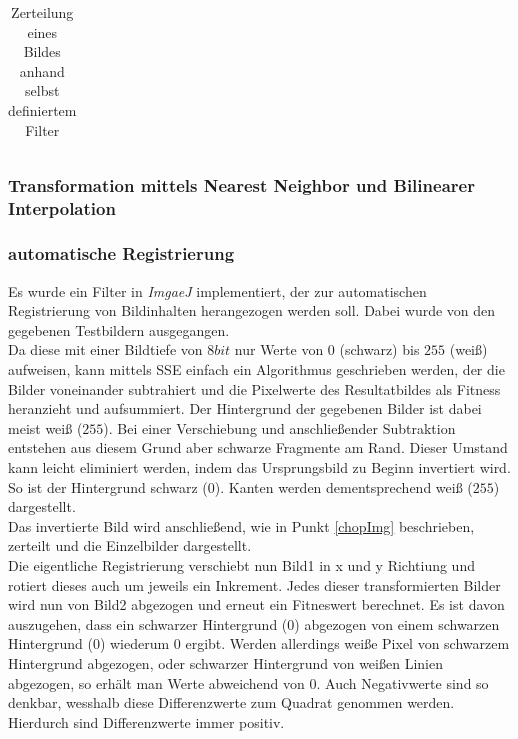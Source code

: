 \documentclass[12pt,german]{article}
\begin{document}
\begin{table}[H]
\begin{tabular}{| c | c | c |}
  \end{tabular}
  \caption{Zerteilung eines Bildes anhand selbst definiertem Filter}
  \label{tab:chopInHalfTest}
\end{table}



\subsubsection{Transformation mittels Nearest Neighbor und Bilinearer Interpolation}




\subsubsection{automatische Registrierung}
Es wurde ein Filter in \textit{ImgaeJ} implementiert, der zur automatischen Registrierung von Bildinhalten herangezogen werden soll. Dabei wurde von den gegebenen Testbildern ausgegangen. \\
Da diese mit einer Bildtiefe von $8 bit$ nur Werte von $0$ (schwarz) bis $255$ (weiß) aufweisen, kann mittels SSE einfach ein Algorithmus geschrieben werden, der die Bilder voneinander subtrahiert und die Pixelwerte des Resultatbildes als Fitness heranzieht und aufsummiert. Der Hintergrund der gegebenen Bilder ist dabei meist weiß ($255$). Bei einer Verschiebung und anschließender Subtraktion entstehen aus diesem Grund aber schwarze Fragmente am Rand. Dieser Umstand kann leicht eliminiert werden, indem das Ursprungsbild zu Beginn invertiert wird. So ist der Hintergrund schwarz ($0$). Kanten werden dementsprechend weiß ($255$) dargestellt. \\
Das invertierte Bild wird anschließend, wie in Punkt \ref{chopImg} beschrieben, zerteilt und die Einzelbilder dargestellt. \\
Die eigentliche Registrierung verschiebt nun Bild1 in x und y Richtiung und rotiert dieses auch um jeweils ein Inkrement. Jedes dieser transformierten Bilder wird nun von Bild2 abgezogen und erneut ein Fitneswert berechnet. Es ist davon auszugehen, dass ein schwarzer Hintergrund ($0$) abgezogen von einem schwarzen Hintergrund ($0$) wiederum $0$ ergibt. Werden allerdings weiße Pixel von schwarzem Hintergrund abgezogen, oder schwarzer Hintergrund von weißen Linien abgezogen, so erhält man Werte abweichend von $0$. Auch Negativwerte sind so denkbar, wesshalb diese Differenzwerte zum Quadrat genommen werden. Hierdurch sind Differenzwerte immer positiv.\\
\end{document}
